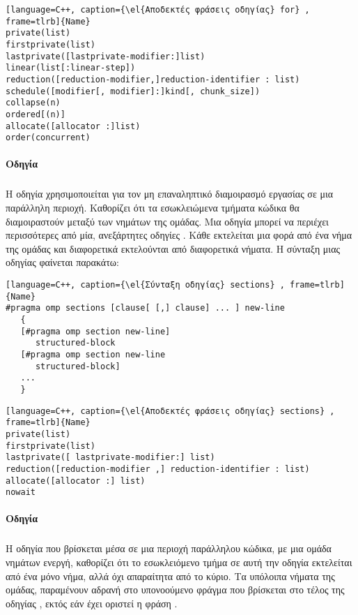 \begin{lstlisting}[language=C++, caption={\el{Αποδεκτές φράσεις οδηγίας} for} , frame=tlrb]{Name}
private(list)
firstprivate(list)
lastprivate([lastprivate-modifier:]list)
linear(list[:linear-step])
reduction([reduction-modifier,]reduction-identifier : list)
schedule([modifier[, modifier]:]kind[, chunk_size])
collapse(n)
ordered[(n)]
allocate([allocator :]list)
order(concurrent)
\end{lstlisting}


\paragraph{Οδηγία \emph{}}
\subparagraph{}
Η οδηγία \emph{} χρησιμοποιείται για τον μη επαναληπτικό διαμοιρασμό εργασίας σε μια παράλληλη περιοχή. Καθορίζει ότι τα εσωκλειώμενα τμήματα κώδικα θα διαμοιραστούν μεταξύ των νημάτων της ομάδας. Μια οδηγία \emph{} μπορεί να περιέχει περισσότερες από μία, ανεξάρτητες οδηγίες \emph{}. Κάθε \emph{} εκτελείται μια φορά από ένα νήμα της ομάδας και διαφορετικά \emph{} εκτελούνται από διαφορετικά νήματα. Η σύνταξη μιας οδηγίας \emph{} φαίνεται παρακάτω\cite{pdplab}:

\begin{lstlisting}[language=C++, caption={\el{Σύνταξη οδηγίας} sections} , frame=tlrb]{Name}
#pragma omp sections [clause[ [,] clause] ... ] new-line 
   { 
   [#pragma omp section new-line] 
      structured-block 
   [#pragma omp section new-line 
      structured-block] 
   ... 
   }
\end{lstlisting}
\clearpage
\begin{lstlisting}[language=C++, caption={\el{Αποδεκτές φράσεις οδηγίας} sections} , frame=tlrb]{Name}
private(list) 
firstprivate(list) 
lastprivate([ lastprivate-modifier:] list) 
reduction([reduction-modifier ,] reduction-identifier : list) 
allocate([allocator :] list) 
nowait
\end{lstlisting}

\paragraph{Οδηγία \emph{}}
\subparagraph{}
Η οδηγία \emph{} που βρίσκεται μέσα σε μια περιοχή παράλληλου κώδικα, με μια ομάδα νημάτων ενεργή, καθορίζει ότι το εσωκλειόμενο τμήμα σε αυτή την οδηγία εκτελείται από ένα μόνο νήμα, αλλά όχι απαραίτητα από το κύριο. Τα υπόλοιπα νήματα της ομάδας, παραμένουν αδρανή στο υπονοούμενο φράγμα που βρίσκεται στο τέλος της οδηγίας \emph{}, εκτός εάν έχει οριστεί η φράση \emph{}\cite{openmpse16}.

